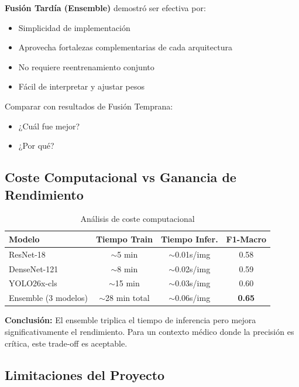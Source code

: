 \documentclass[12pt,a4paper]{article}
\begin{document}
\textbf{Fusión Tardía (Ensemble)} demostró ser efectiva por:
\begin{itemize}
    \item Simplicidad de implementación
    \item Aprovecha fortalezas complementarias de cada arquitectura
    \item No requiere reentrenamiento conjunto
    \item Fácil de interpretar y ajustar pesos
\end{itemize}

\begin{pendiente}
Comparar con resultados de Fusión Temprana:
\begin{itemize}
    \item ¿Cuál fue mejor?
    \item ¿Por qué?
\end{itemize}
\end{pendiente}

\subsection{Coste Computacional vs Ganancia de Rendimiento}

\begin{table}[H]
\centering
\begin{tabular}{lccc}
\toprule
\textbf{Modelo} & \textbf{Tiempo Train} & \textbf{Tiempo Infer.} & \textbf{F1-Macro} \\
\midrule
ResNet-18 & $\sim$5 min & $\sim$0.01s/img & 0.58 \\
DenseNet-121 & $\sim$8 min & $\sim$0.02s/img & 0.59 \\
YOLO26x-cls & $\sim$15 min & $\sim$0.03s/img & 0.60 \\
Ensemble (3 modelos) & $\sim$28 min total & $\sim$0.06s/img & \textbf{0.65} \\
\bottomrule
\end{tabular}
\caption{Análisis de coste computacional}
\label{tab:coste}
\end{table}

\textbf{Conclusión:} El ensemble triplica el tiempo de inferencia pero mejora significativamente el rendimiento. Para un contexto médico donde la precisión es crítica, este trade-off es aceptable.

\subsection{Limitaciones del Proyecto}
\end{document}
